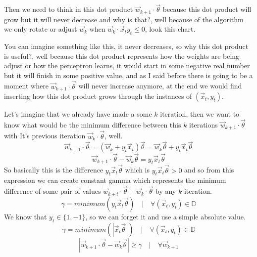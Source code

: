 \documentclass[12pt]{article}
\begin{document}
Then we need to think in this
dot product $\vec{w}_{k + 1} \cdot \vec{\theta}$ because this dot product
will grow but it will never decrease and why is that?, well because of the algorithm we only
rotate or adjust $\vec{w}_{k}$ when $\vec{w}_k \cdot \vec{x}_ty_t \le 0$, look this chart.
\begin{center}
\end{center}
You can imagine something like this, it never decreases, so why this dot product is useful?, well
because this dot product represents how the weights are being adjust or how the perceptron learns,
it would start in some negative real number but it will finish in some positive value,
and as I said before there is going to be a moment where $\vec{w}_{k+1} \cdot \vec{\theta}$
will never increase
anymore, at the end we would find inserting how this dot product grows through
the instances of $(\vec{x}_t, y_t)$.
\begin{center}
\end{center}
Let's imagine that we already have made a some $k$ iteration,
then we want to know what would be 
the minimum difference between this $k$ iterations $\vec{w}_{k+1} \cdot \vec{\theta}$ with It's
previous iteration $\vec{w}_{k} \cdot \vec{\theta}$, well.
\[
  \vec{w}_{k + 1} \cdot \vec{\theta} = (\vec{w}_{k} + y_t\vec{x}_t) \vec{\theta}
  = \vec{w}_{k}\vec{\theta} + y_t\vec{x}_t\vec{\theta}
\]
\[
  \vec{w}_{k + 1} \cdot \vec{\theta} -  \vec{w}_{k}\vec{\theta}
  =  y_t\vec{x}_t\vec{\theta}
\]
So basically this is
the difference $y_t\vec{x}_t\vec{\theta}$ which is $y_t\vec{x}_t\vec{\theta} > 0$ and so
from this expression we can create constant gamma which represents the minimum
difference of some pair of values $\vec{w}_{k+t} \cdot \vec{\theta} - \vec{w}_{k} \cdot \vec{\theta}$
by any $k$ iteration.
\[
  \gamma = minimum(y_t \vec{x}_t\vec{\theta}) \quad|\quad \forall (\vec{x}_t, y_t) \in \mathbb{D}
\]
We know that $y_t \in \{1, -1\}$, so we can forget it and use a simple absolute value.
\[
  \gamma = minimum(|\vec{x}_t\vec{\theta}|) \quad|\quad \forall (\vec{x}_t, y_t) \in \mathbb{D}
\]
\[
  |\vec{w}_{k + 1} \cdot \vec{\theta} -  \vec{w}_{k}\vec{\theta}|
  \ge \gamma\quad | \quad \forall \vec{w}_{k+1}
\]
\end{document}
